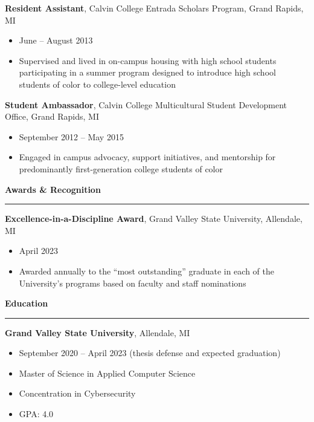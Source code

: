 \documentclass[a4paper, 11pt]{article}
\begin{document}
      \textbf{Resident Assistant}, Calvin College Entrada Scholars Program, Grand Rapids, MI
      \begin{itemize}
          \item June -- August 2013
          \item Supervised and lived in on-campus housing with high school students participating in a summer program designed to introduce high school students of color to college-level education
      \end{itemize}

      \textbf{Student Ambassador}, Calvin College Multicultural Student Development Office, Grand Rapids, MI
      \begin{itemize}
          \item September 2012 -- May 2015
          \item Engaged in campus advocacy, support initiatives, and mentorship for predominantly first-generation college students of color
      \end{itemize}


    \vspace{1em}
    {\noindent\large\textbf{Awards \& Recognition}\par}\vspace{.25em}
    \hrule
    \vspace{1em}

      \textbf{Excellence-in-a-Discipline Award}, Grand Valley State University, Allendale, MI
      \begin{itemize}
          \item April 2023
          \item Awarded annually to the ``most outstanding'' graduate in each of the University's programs based on faculty and staff nominations
      \end{itemize}


    \vspace{1em}
    {\noindent\large\textbf{Education}\par}\vspace{.25em}
    \hrule
    \vspace{1em}

      {\textbf{Grand Valley State University}, Allendale, MI
      \begin{itemize}
        \item September 2020 -- April 2023 (thesis defense and expected graduation)
        \item Master of Science in Applied Computer Science
        \item Concentration in Cybersecurity
        \item GPA: 4.0
      \end{itemize}}
\end{document}
